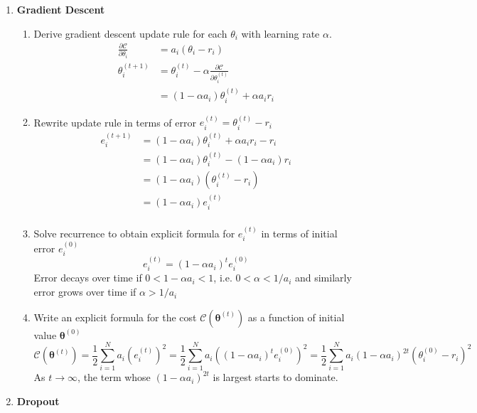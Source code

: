 \documentclass[11pt]{article}
\begin{document}
\newcommand{\bt}{\boldsymbol{\theta}}
\renewcommand{\E}[1]{\mathbb{E}\left\{#1\right\}}
\newcommand{\var}[1]{var\left\{#1\right\}}
\newcommand{\bx}{\mathbf{x}}
\newcommand{\bw}{\mathbf{w}}


\begin{enumerate}
\item \textbf{Gradient Descent}
\begin{enumerate}
    \item Derive gradient descent update rule for each $\theta_i$ with learning rate $\alpha$. 
    \begin{align*}
        \frac{\partial \mathcal{C}}{\partial \theta_i} &= a_i (\theta_i - r_i) \\
        \theta_i^{(t+1)} 
        &= \theta_i^{(t)} - \alpha \frac{\partial \mathcal{C}}{\partial \theta_i^{(t)}} \\
        &= (1-\alpha a_i)\theta_i^{(t)} + \alpha a_i r_i    
    \end{align*}
    \item Rewrite update rule in terms of error $e_i^{(t)} = \theta_i^{(t)} - r_i$
    \begin{align*}
        e_i^{(t+1)} &= (1-\alpha a_i)\theta_i^{(t)} + \alpha a_i r_i - r_i \\ 
        &= (1-\alpha a_i)\theta_i^{(t)} - (1-\alpha a_i)r_i \\
        &= (1-\alpha a_i)(\theta_i^{(t)} - r_i) \\
        &= (1-\alpha a_i) e_i^{(t)} \\ 
    \end{align*}
    \item Solve recurrence to obtain explicit formula for $e_i^{(t)}$ in terms of initial error $e_i^{(0)}$
    \[
        e_i^{(t)} = (1-\alpha a_i)^t e_i^{(0)}
    \]
    Error decays over time if $0< 1-\alpha a_i < 1$, i.e. $0 < \alpha < 1/a_i$ and similarly error grows over time if $\alpha > 1/a_i$ 
    \item Write an explicit formula for the cost $\mathcal{C}(\bt^{(t)})$ as a function of initial value $\bt^{(0)}$
    \[
        \mathcal{C}(\bt^{(t)}) 
        = \frac{1}{2}\sum_{i=1}^N a_i \left( e_i^{(t)} \right)^2
        = \frac{1}{2}\sum_{i=1}^N a_i \left( (1-\alpha a_i)^t e_i^{(0)} \right)^2
        = \frac{1}{2}\sum_{i=1}^N a_i \left( 1-\alpha a_i \right)^{2t} \left(\theta_i^{(0)} - r_i\right)^2
    \]
    As $t\rightarrow \infty$, the term whose $(1-\alpha a_i)^{2t}$ is largest starts to dominate.
\end{enumerate}
\item \textbf{Dropout}

\end{enumerate}
\end{document}
